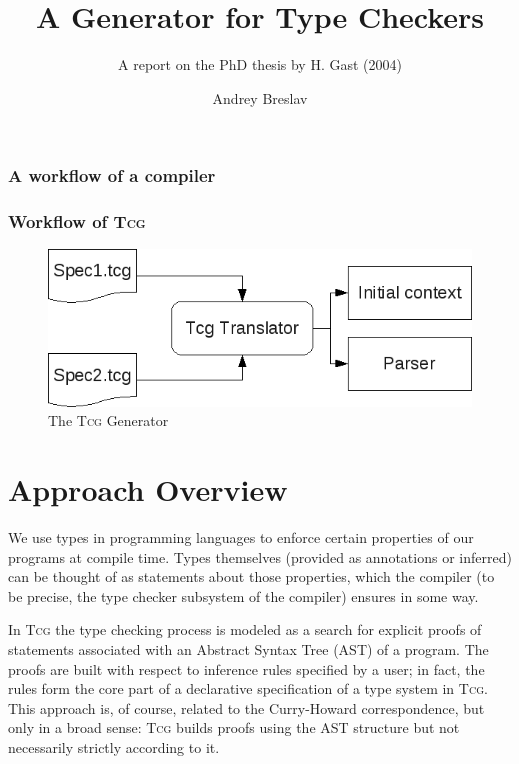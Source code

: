 \documentclass[screen]{beamer}
\title{A Generator for Type Checkers}
\subtitle{A report on the PhD thesis by H. Gast (2004)}
\author{Andrey Breslav}
\institute{ITMO University, St. Petersburg / University of Tartu}
\newcommand{\Tcg}{\textsc{Tcg}}
\begin{document}
\frame{\titlepage}

\begin{frame}[t,fragile]
\frametitle{A workflow of a compiler}%

\end{frame}

\begin{frame}[t,fragile]
\frametitle{Workflow of \Tcg{}}%

\begin{figure}[htp]
\centering
\includegraphics[width=.7\textwidth]{../generator}
\caption{The \Tcg{} Generator}
\end{figure}

\end{frame}

\section{Approach Overview}

We use types in programming languages to enforce certain properties of our programs at compile time. Types themselves (provided as annotations or inferred) can be thought of as statements about those properties, which the compiler (to be precise, the type checker subsystem of the compiler) ensures in some way.

In \Tcg{} the type checking process is modeled as a search for explicit proofs of statements associated with an Abstract Syntax Tree (AST) of a program. The proofs are built with respect to inference rules specified by a user; in fact, the rules form the core part of a declarative specification of a type system in \Tcg{}. This approach is, of course, related to the Curry-Howard correspondence, but only in a broad sense: \Tcg{} builds proofs using the AST structure but not necessarily strictly according to it. 
\end{document}
